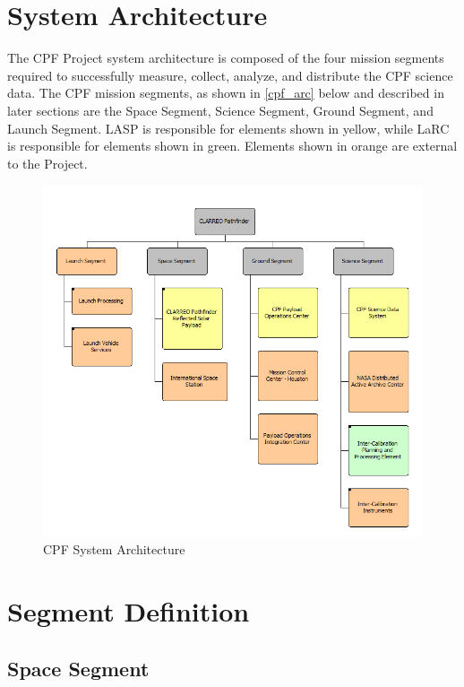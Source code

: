 \documentclass[12pt,oneside,oldfontcommands]{memoir}
\begin{document}
\section{System Architecture }
\label{systemarchitecture}

The \gls{CPF} Project system architecture is composed of the four mission segments required to successfully \gls{measure}, \gls{collect}, analyze, and distribute the \gls{CPF} science data. The \gls{CPF} mission segments, as shown in \autoref{cpf_arc} below and described in later sections are the Space Segment, Science Segment, Ground Segment, and Launch Segment. \gls{LASP} is responsible for elements shown in yellow, while \gls{LaRC} is responsible for elements shown in green. Elements shown in orange are external to the Project.

\begin{figure}[htbp]
\centering
\includegraphics[keepaspectratio,width=5.75in,height=0.75\textheight]{20180416_cpf_architecture_l1-3.png}
\caption{\gls{CPF} System Architecture}
\label{cpf_arc}
\end{figure}

\section{Segment Definition }
\label{segmentdefinition}

\subsection{Space Segment }
\label{spacesegment}
\end{document}
